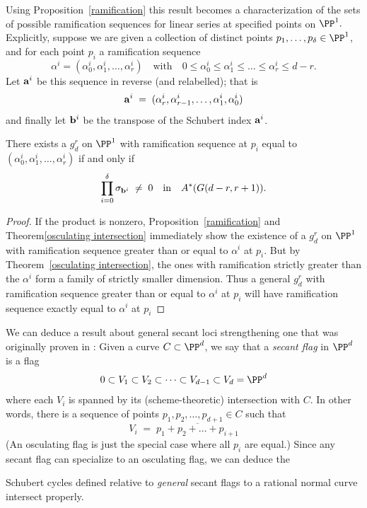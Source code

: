 Using Proposition~\ref{ramification} this result becomes a characterization of the sets of possible ramification
sequences for linear series at specified points on $\PP^1.$
 Explicitly, suppose we are given a collection of distinct points $p_1,\dots,p_\delta \in \PP^1$, and for each point $p_i$ a ramification sequence
$$
\alpha^i = (\alpha^i_0, \alpha^i_1, \dots, \alpha^i_r) \quad \text{with} \quad 0 \leq \alpha^i_0 \leq \alpha^i_1 \leq \dots \leq \alpha^i_r \leq d-r.
$$
Let ${\bf a}^i$ be this sequence in reverse (and relabelled); that is
$$
{\bf a}^i \; = \; (\alpha^i_r, \alpha^i_{r-1}, \dots, \alpha^i_1, \alpha^i_0)
$$
and finally let ${\bf b}^i$ be the transpose of the Schubert index ${\bf a}^i$. 

\begin{corollary}
There exists a $g^r_d$ on $\PP^1$ with ramification sequence at $p_i$ equal to $(\alpha^i_0, \alpha^i_1, \dots, \alpha^i_r)$ if and only if 
$$
\prod_{i=0}^\delta  \sigma_{{\bf b}^i} \; \neq \; 0 \quad \text{in} \quad A^*(G(d-r, r+1)).
$$
\end{corollary}

\begin{proof}
If the product is nonzero, Proposition~\ref{ramification} and Theorem\ref{osculating intersection} immediately show the existence of a $g^r_d$ on $\PP^1$ with ramification sequence greater than or equal to $\alpha^i$ at $p_i$. But by Theorem~\ref{osculating intersection}, the ones with ramification strictly greater than the $\alpha^i$ form a family of strictly smaller dimension. Thus a general $g^r_d$ with ramification sequence greater than or equal to $\alpha^i$ at $p_i$ will have  ramification sequence exactly equal to $\alpha^i$ at $p_i$
\end{proof}

We can deduce a result about general secant loci strengthening one that was originally proven in \cite{Griffiths-Harris-BN}:
Given a curve $C \subset \PP^d$, we say that a \emph{secant flag} in $\PP^d$ is a flag
$$
0 \subset V_1 \subset V_2 \subset \dots \subset V_{d-1} \subset V_d = \PP^d
$$
where each $V_i$ is spanned by its (scheme-theoretic) intersection with $C$. In other words, there is a sequence of points $p_1, p_2, \dots, p_{d+1} \in C$ such that
$$
V_i \; = \; \overline{p_1+p_2+ \dots + p_{i+1}}
$$
(An osculating flag is just the special case where all $p_i$ are equal.) Since any secant flag can specialize to an osculating flag, we can deduce the

\begin{corollary}\label{secant schubert proper}
Schubert cycles defined relative to \emph{general} secant flags to a rational normal curve intersect properly.
\end{corollary} 

